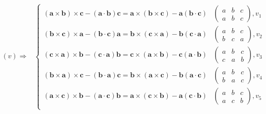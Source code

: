 \documentclass[
]{book}
\theoremstyle{definition}
\theoremstyle{definition}
\theoremstyle{definition}
\theoremstyle{definition}
\theoremstyle{remark}
\begin{document}
\[
\begin{aligned}
\left(v\right)\Rightarrow & \begin{cases}
\left(\boldsymbol{a}\times\boldsymbol{b}\right)\times\boldsymbol{c}-\left(\boldsymbol{a}\cdot\boldsymbol{b}\right)\boldsymbol{c}=\boldsymbol{a}\times\left(\boldsymbol{b}\times\boldsymbol{c}\right)-\boldsymbol{a}\left(\boldsymbol{b}\cdot\boldsymbol{c}\right) & \begin{pmatrix}a & b & c\\
a & b & c
\end{pmatrix},v_{{\scriptscriptstyle 1}}\\
\left(\boldsymbol{b}\times\boldsymbol{c}\right)\times\boldsymbol{a}-\left(\boldsymbol{b}\cdot\boldsymbol{c}\right)\boldsymbol{a}=\boldsymbol{b}\times\left(\boldsymbol{c}\times\boldsymbol{a}\right)-\boldsymbol{b}\left(\boldsymbol{c}\cdot\boldsymbol{a}\right) & \begin{pmatrix}a & b & c\\
b & c & a
\end{pmatrix},v_{{\scriptscriptstyle 2}}\\
\left(\boldsymbol{c}\times\boldsymbol{a}\right)\times\boldsymbol{b}-\left(\boldsymbol{c}\cdot\boldsymbol{a}\right)\boldsymbol{b}=\boldsymbol{c}\times\left(\boldsymbol{a}\times\boldsymbol{b}\right)-\boldsymbol{c}\left(\boldsymbol{a}\cdot\boldsymbol{b}\right) & \begin{pmatrix}a & b & c\\
c & a & b
\end{pmatrix},v_{{\scriptscriptstyle 3}}\\
\left(\boldsymbol{b}\times\boldsymbol{a}\right)\times\boldsymbol{c}-\left(\boldsymbol{b}\cdot\boldsymbol{a}\right)\boldsymbol{c}=\boldsymbol{b}\times\left(\boldsymbol{a}\times\boldsymbol{c}\right)-\boldsymbol{b}\left(\boldsymbol{a}\cdot\boldsymbol{c}\right) & \begin{pmatrix}a & b & c\\
b & a & c
\end{pmatrix},v_{{\scriptscriptstyle 4}}\\
\left(\boldsymbol{a}\times\boldsymbol{c}\right)\times\boldsymbol{b}-\left(\boldsymbol{a}\cdot\boldsymbol{c}\right)\boldsymbol{b}=\boldsymbol{a}\times\left(\boldsymbol{c}\times\boldsymbol{b}\right)-\boldsymbol{a}\left(\boldsymbol{c}\cdot\boldsymbol{b}\right) & \begin{pmatrix}a & b & c\\
a & c & b
\end{pmatrix},v_{{\scriptscriptstyle 5}}\\

\end{cases}
\end{aligned}\]
\end{document}
